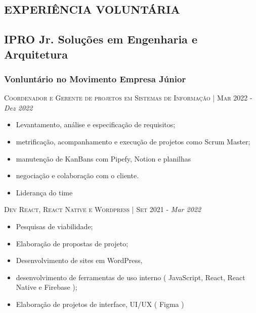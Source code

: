 
\begin{framed}
    \section{EXPERIÊNCIA VOLUNTÁRIA}
    \subsection{  IPRO Jr. Soluções em Engenharia e Arquitetura}
    \subsubsection{Vonluntário no Movimento Empresa Júnior}

         \textsc{Coordenador e Gerente de projetos em Sistemas de Informação } | \textsc{Mar 2022} - \emph{Dez 2022}
         \small{
            \begin{itemize}[leftmargin=*]
                \item Levantamento, análise e especificação de requisitos;
                \item metrificação, acompanhamento e execução de projetos como Scrum Master;
                \item manutenção de KanBans com Pipefy, Notion e planilhas
                \item negociação e colaboração com o cliente.
                \item Liderança do time
            \end{itemize}
        }                                                                                         

     \textsc{Dev React, React Native e Wordpress }    | \textsc{Set 2021} - \emph{Mar 2022}                     
         \small{
            \begin{itemize}[leftmargin=*]
                \item Pesquisas de viabilidade;
                \item Elaboração de propostas de projeto;
                \item Desenvolvimento de sites em WordPress,
                \item desenvolvimento de ferramentas de uso interno ( JavaScript, React, React Native e Firebase );
                \item Elaboração de projetos de interface, UI/UX ( Figma )
            \end{itemize}
        }                                                                                         


\end{framed}
